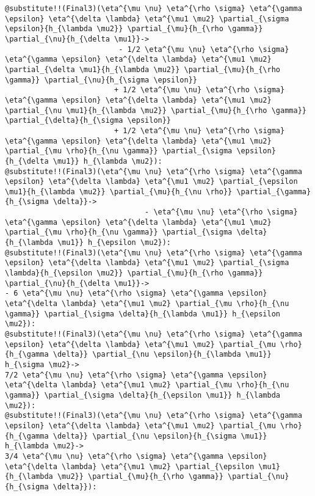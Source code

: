 \documentclass[11pt]{article}
\begin{document}
{\color[named]{Blue}\begin{verbatim}
@substitute!!(Final3)(\eta^{\mu \nu} \eta^{\rho \sigma} \eta^{\gamma \epsilon} \eta^{\delta \lambda} \eta^{\mu1 \mu2} \partial_{\sigma \epsilon}{h_{\lambda \mu2}} \partial_{\mu}{h_{\rho \gamma}} \partial_{\nu}{h_{\delta \mu1}}->
                          - 1/2 \eta^{\mu \nu} \eta^{\rho \sigma} \eta^{\gamma \epsilon} \eta^{\delta \lambda} \eta^{\mu1 \mu2} \partial_{\delta \mu1}{h_{\lambda \mu2}} \partial_{\mu}{h_{\rho \gamma}} \partial_{\nu}{h_{\sigma \epsilon}}
                         + 1/2 \eta^{\mu \nu} \eta^{\rho \sigma} \eta^{\gamma \epsilon} \eta^{\delta \lambda} \eta^{\mu1 \mu2} \partial_{\nu \mu1}{h_{\lambda \mu2}} \partial_{\mu}{h_{\rho \gamma}} \partial_{\delta}{h_{\sigma \epsilon}}
                         + 1/2 \eta^{\mu \nu} \eta^{\rho \sigma} \eta^{\gamma \epsilon} \eta^{\delta \lambda} \eta^{\mu1 \mu2} \partial_{\mu \rho}{h_{\nu \gamma}} \partial_{\sigma \epsilon}{h_{\delta \mu1}} h_{\lambda \mu2}):
@substitute!!(Final3)(\eta^{\mu \nu} \eta^{\rho \sigma} \eta^{\gamma \epsilon} \eta^{\delta \lambda} \eta^{\mu1 \mu2} \partial_{\epsilon \mu1}{h_{\lambda \mu2}} \partial_{\mu}{h_{\nu \rho}} \partial_{\gamma}{h_{\sigma \delta}}->
                                - \eta^{\mu \nu} \eta^{\rho \sigma} \eta^{\gamma \epsilon} \eta^{\delta \lambda} \eta^{\mu1 \mu2} \partial_{\mu \rho}{h_{\nu \gamma}} \partial_{\sigma \delta}{h_{\lambda \mu1}} h_{\epsilon \mu2}):
@substitute!!(Final3)(\eta^{\mu \nu} \eta^{\rho \sigma} \eta^{\gamma \epsilon} \eta^{\delta \lambda} \eta^{\mu1 \mu2} \partial_{\sigma \lambda}{h_{\epsilon \mu2}} \partial_{\mu}{h_{\rho \gamma}} \partial_{\nu}{h_{\delta \mu1}}-> 
- 6 \eta^{\mu \nu} \eta^{\rho \sigma} \eta^{\gamma \epsilon} \eta^{\delta \lambda} \eta^{\mu1 \mu2} \partial_{\mu \rho}{h_{\nu \gamma}} \partial_{\sigma \delta}{h_{\lambda \mu1}} h_{\epsilon \mu2}): 
@substitute!!(Final3)(\eta^{\mu \nu} \eta^{\rho \sigma} \eta^{\gamma \epsilon} \eta^{\delta \lambda} \eta^{\mu1 \mu2} \partial_{\mu \rho}{h_{\gamma \delta}} \partial_{\nu \epsilon}{h_{\lambda \mu1}} h_{\sigma \mu2}-> 
7/2 \eta^{\mu \nu} \eta^{\rho \sigma} \eta^{\gamma \epsilon} \eta^{\delta \lambda} \eta^{\mu1 \mu2} \partial_{\mu \rho}{h_{\nu \gamma}} \partial_{\sigma \delta}{h_{\epsilon \mu1}} h_{\lambda \mu2}): 
@substitute!!(Final3)(\eta^{\mu \nu} \eta^{\rho \sigma} \eta^{\gamma \epsilon} \eta^{\delta \lambda} \eta^{\mu1 \mu2} \partial_{\mu \rho}{h_{\gamma \delta}} \partial_{\nu \epsilon}{h_{\sigma \mu1}} h_{\lambda \mu2}-> 
3/4 \eta^{\mu \nu} \eta^{\rho \sigma} \eta^{\gamma \epsilon} \eta^{\delta \lambda} \eta^{\mu1 \mu2} \partial_{\epsilon \mu1}{h_{\lambda \mu2}} \partial_{\mu}{h_{\rho \gamma}} \partial_{\nu}{h_{\sigma \delta}}): 

\end{verbatim}}
\end{document}
